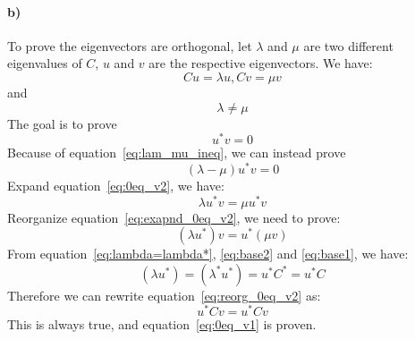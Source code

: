 \documentclass{article}
\begin{document}
\paragraph{b)} To prove the eigenvectors are orthogonal, let $\lambda$ and $\mu$ are two different eigenvalues of $C$, $u$ and $v$ are the respective eigenvectors. We have:
\begin{equation}
\label{eq:base2}
Cu = \lambda u, Cv = \mu v
\end{equation}
and 
\begin{equation}
\label{eq:lam_mu_ineq}
\lambda \ne \mu
\end{equation}
The goal is to prove
\begin{equation}
\label{eq:0eq_v1}
u^* v = 0
\end{equation}
Because of equation~\ref{eq:lam_mu_ineq}, we can instead prove
\begin{equation}
\label{eq:0eq_v2}
(\lambda - \mu)u^* v = 0
\end{equation}
Expand equation~\ref{eq:0eq_v2}, we have:
\begin{equation}
\label{eq:exapnd_0eq_v2}
\lambda u^* v = \mu u^* v
\end{equation}
Reorganize equation~\ref{eq:exapnd_0eq_v2}, we need to prove:
\begin{equation}
\label{eq:reorg_0eq_v2}
(\lambda u^*) v = u^* (\mu v)
\end{equation}
From equation~\ref{eq:lambda=lambda*}, \ref{eq:base2} and \ref{eq:base1}, we have:
\begin{equation}
(\lambda u^*) = (\lambda^* u^*) = u^* C^* = u^* C
\end{equation}
Therefore we can rewrite equation~\ref{eq:reorg_0eq_v2} as:
\begin{equation}
u^* C v = u^* C v
\end{equation}
This is always true, and equation~\ref{eq:0eq_v1} is proven. 
\end{document}
